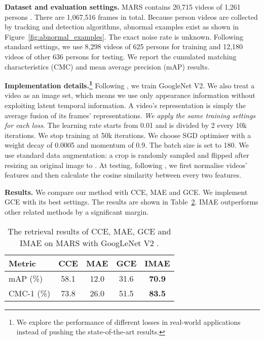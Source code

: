 \documentclass{article}
\begin{document}
\begin{table}[!t]
\noindent
\textbf{Dataset and evaluation settings.} MARS contains 20,715 videos of 1,261 persons \cite{zheng2016mars}. 
There are 1,067,516 frames in total. 
Because person videos are collected by tracking and detection algorithms, 
abnormal examples exist as shown in Figure~\ref{fig:abnormal_examples}.
The exact noise rate is unknown.
Following standard settings, we use 8,298 videos of 625 persons for training 
and 12,180 videos of other 636 persons for testing. 
We report the cumulated matching characteristics (CMC) and mean average precision (mAP) results.

\noindent
\textbf{Implementation details.\footnote{We explore the performance of different losses in real-world applications instead of pushing the state-of-the-art results.}}  Following \cite{liu2017qan,wang2019deep}, we train GoogleNet V2. We also treat a video as an image set, which means we use only appearance information without exploiting latent temporal information. 
A video's representation is simply the average fusion of its frames' representations.
\textit{We apply the same training settings for each loss}. The learning rate starts from 0.01 and is divided by 2 every 10k iterations. We stop training at 50k iterations. We choose SGD optimiser with a weight decay of 0.0005 and momentum of 0.9. The batch size is set to 180. We use standard data augmentation: a  crop is randomly sampled and flipped after resizing an original image to . 
At testing, following \cite{wang2019deep,movshovitz2017no,law2017deep}, we first  normalise videos' features and then calculate the cosine similarity between every two features.  


\noindent
\textbf{Results.} We compare our method with CCE, MAE and GCE. 
We implement GCE with its best settings. 
The results are shown in Table~\ref{table:MARS_ReID}. 
IMAE outperforms other related methods by a significant margin.




\begin{table}[!h]
\caption{
		The retrieval results of CCE, MAE, GCE and IMAE on MARS with GoogLeNet V2 \cite{ioffe2015batch}.
	}
	\centering
	\vspace{-0.2cm}
	\setlength{\tabcolsep}{6pt} \begin{tabular}{lcccc}
		\hline
		Metric & CCE & MAE & GCE & IMAE\\
		\hline
		mAP (\%) & 58.1 & 12.0 & 31.6 & \textbf{70.9}\\
		CMC-1 (\%) & 73.8 & 26.0 & 51.5 & \textbf{83.5}\\
		\hline
	\end{tabular}
	\label{table:MARS_ReID}
	\vspace{-0.3cm}
\end{table}









\end{table}
\end{document}
